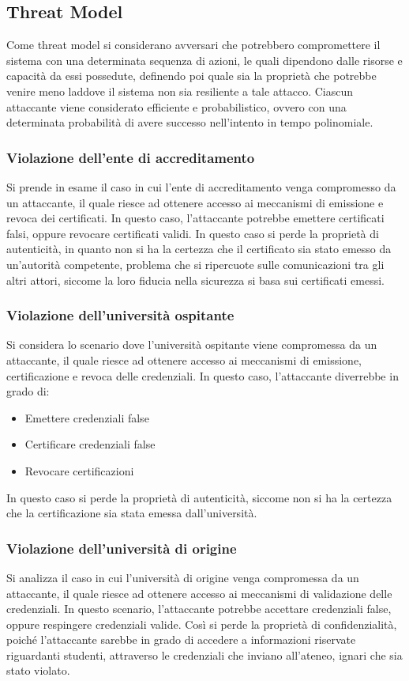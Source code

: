 \documentclass[a4paper,12pt]{article}
\begin{document}
\subsection{Threat Model}
Come threat model si considerano avversari che potrebbero compromettere il sistema con una determinata sequenza di azioni, le quali dipendono dalle risorse e capacità da essi possedute, definendo poi quale sia la proprietà che potrebbe venire meno laddove il sistema non sia resiliente a tale attacco.
\newline Ciascun attaccante viene considerato efficiente e probabilistico, ovvero con una determinata probabilità di avere successo nell'intento in tempo polinomiale.
\subsubsection{Violazione dell'ente di accreditamento}
Si prende in esame il caso in cui l'ente di accreditamento venga compromesso da un attaccante, il quale riesce ad ottenere accesso ai meccanismi di emissione e revoca dei certificati. In questo caso, l'attaccante potrebbe emettere certificati falsi, oppure revocare certificati validi.
\newline In questo caso si perde la proprietà di autenticità, in quanto non si ha la certezza che il certificato sia stato emesso da un'autorità competente, problema che si ripercuote sulle comunicazioni tra gli altri attori, siccome la loro fiducia nella sicurezza si basa sui certificati emessi.
\subsubsection{Violazione dell'università ospitante}
Si considera lo scenario dove l'università ospitante viene compromessa da un attaccante, il quale riesce ad ottenere accesso ai meccanismi di emissione, certificazione e revoca delle credenziali. In questo caso, l'attaccante diverrebbe in grado di:
\begin{itemize}
    \item Emettere credenziali false
    \item Certificare credenziali false
    \item Revocare certificazioni
\end{itemize}
In questo caso si perde la proprietà di autenticità, siccome non si ha la certezza che la certificazione sia stata emessa dall'università.
\subsubsection{Violazione dell'università di origine}
Si analizza il caso in cui l'università di origine venga compromessa da un attaccante, il quale riesce ad ottenere accesso ai meccanismi di validazione delle credenziali. In questo scenario, l'attaccante potrebbe accettare credenziali false, oppure respingere credenziali valide.
\newline Così si perde la proprietà di confidenzialità, poiché l'attaccante sarebbe in grado di accedere a informazioni riservate riguardanti studenti, attraverso le credenziali che inviano all'ateneo, ignari che sia stato violato.
\end{document}
